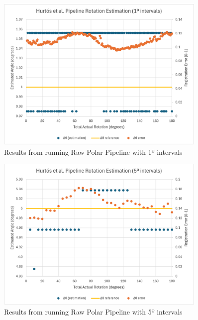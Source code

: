 \begin{figure}[H]
  \centering
  \includegraphics[width=0.9\textwidth]{figures/results/Rotation-Graphs/PC-1.png}
  \caption{Results from running Raw Polar Pipeline with 1º intervals}
\end{figure}

\begin{figure}[H]
  \centering
  \includegraphics[width=0.9\textwidth]{figures/results/Rotation-Graphs/PC-5.png}
  \caption{Results from running Raw Polar Pipeline with 5º intervals}
\end{figure}

